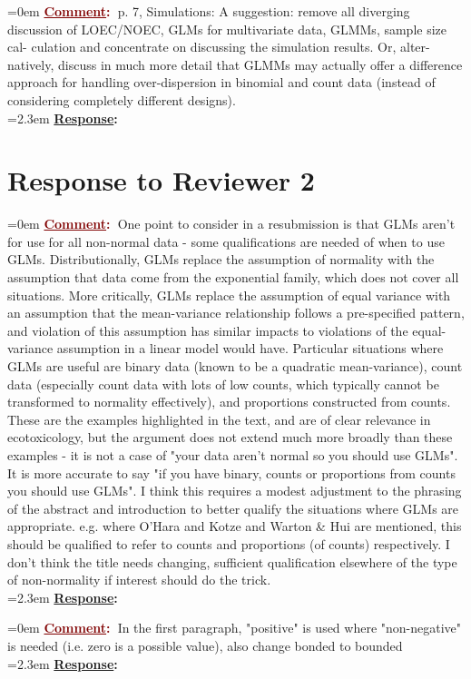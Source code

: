 \documentclass[12pt]{article}
\newcommand{\comment}[0]{\vspace{1em} \noindent \hangindent=0em \textbf{\textcolor{Maroon}{\uline{Comment}:~}}}
\newcommand{\response}[0]{\\\vspace{0.1em} \hangindent=2.3em \textbf{\textcolor{NavyBlue}{\uline{Response}:~}}}
\begin{document}
\comment p. 7, Simulations: A suggestion: remove all diverging discussion of
LOEC/NOEC, GLMs for multivariate data, GLMMs, sample size cal-
culation and concentrate on discussing the simulation results. Or, alter-
natively, discuss in much more detail that GLMMs may actually offer a
difference approach for handling over-dispersion in binomial and count
data (instead of considering completely different designs).
\response




\section{Response to Reviewer 2}

\comment One point to consider in a resubmission is that GLMs aren't for use for all non-normal data - some qualifications are needed of when to use GLMs.  Distributionally, GLMs replace the assumption of normality with the assumption that data come from the exponential family, which does not cover all situations.  More critically, GLMs replace the assumption of equal variance with an assumption that the mean-variance relationship follows a pre-specified pattern, and violation of this assumption has similar impacts to violations of the equal-variance assumption in a linear model would have.  Particular situations where GLMs are useful are binary data (known to be a quadratic mean-variance), count data (especially count data with lots of low counts, which typically cannot be transformed to normality effectively), and proportions constructed from counts.  These are the examples highlighted in the text, and are of clear relevance in ecotoxicology, but the argument does not extend much
more broadly than these examples - it is not a case of "your data aren't normal so you should use GLMs".  It is more accurate to say "if you have binary, counts or proportions from counts you should use GLMs".  I think this requires a modest adjustment to the phrasing of the abstract and introduction to better qualify the situations where GLMs are appropriate.  e.g. where O'Hara and Kotze and Warton \& Hui are mentioned, this should be qualified to refer to counts and proportions (of counts) respectively.  I  don't think the title needs changing, sufficient qualification elsewhere of the type of non-normality if interest should do the trick.
\response

\comment In the first paragraph, "positive" is used where "non-negative" is needed (i.e. zero is a possible value), also change bonded to bounded
\response 
\end{document}
